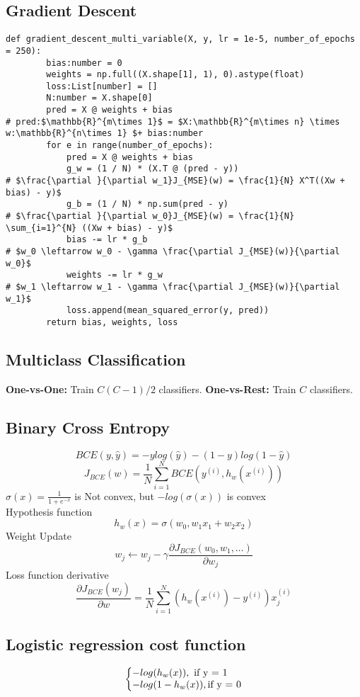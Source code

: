 \documentclass[twocolumn, 10pt]{article}
\makeatletter
\newenvironment{system}%
{\left\lbrace\begin{array}{@{}l@{}}}%
{\end{array}\right.}
\makeatother
\begin{document}
\subsection*{Gradient Descent}
\begin{lstlisting}[mathescape=true]
    def gradient_descent_multi_variable(X, y, lr = 1e-5, number_of_epochs = 250):
        bias:number = 0
        weights = np.full((X.shape[1], 1), 0).astype(float)
        loss:List[number] = []
        N:number = X.shape[0]  
        pred = X @ weights + bias       
# pred:$\mathbb{R}^{m\times 1}$ = $X:\mathbb{R}^{m\times n} \times w:\mathbb{R}^{n\times 1} $+ bias:number
        for e in range(number_of_epochs): 
            pred = X @ weights + bias
            g_w = (1 / N) * (X.T @ (pred - y)) 
# $\frac{\partial }{\partial w_1}J_{MSE}(w) = \frac{1}{N} X^T((Xw + bias) - y)$
            g_b = (1 / N) * np.sum(pred - y)   
# $\frac{\partial }{\partial w_0}J_{MSE}(w) = \frac{1}{N} \sum_{i=1}^{N} ((Xw + bias) - y)$
            bias -= lr * g_b                   
# $w_0 \leftarrow w_0 - \gamma \frac{\partial J_{MSE}(w)}{\partial w_0}$
            weights -= lr * g_w                
# $w_1 \leftarrow w_1 - \gamma \frac{\partial J_{MSE}(w)}{\partial w_1}$
            loss.append(mean_squared_error(y, pred))
        return bias, weights, loss  
    \end{lstlisting}
\subsection*{Multiclass Classification}
\textbf{One-vs-One:} Train $C(C-1)/2$ classifiers.
\textbf{One-vs-Rest:} Train $C$ classifiers.

\subsection*{Binary Cross Entropy}
\[BCE(y, \hat{y}) = -ylog(\hat{y}) - (1 - y)log(1 - \hat{y})\]
\[J_{BCE}(w) = \frac{1}{N} \sum_{i=1}^{N} BCE(y^{(i)}, h_w(x^{(i)}))\]
$\sigma(x) = \frac{1}{1 + e^{-x}}$ is Not convex, but
$-log(\sigma(x))$ is convex\\
Hypothesis function
\[h_w(x) = \sigma(w_0, w_1 x_1 + w_2 x_2) \]
Weight Update
\[w_j \leftarrow w_j - \gamma \frac{\partial J_{BCE}(w_0, w_1, \dots)}{\partial w_j}\]
Loss function derivative
\[\frac{\partial J_{BCE}(w_j)}{\partial w} = \frac{1}{N} \sum_{i=1}^{N} (h_w(x^{(i)}) - y^{(i)})x_j^{(i)}\]
\subsection{Logistic regression cost function}
\begin{equation}
    \begin{system}
    -log(h_w(x)), \text{ if y = 1}\\
    -log(1 - h_w(x)), \text{if y = 0}
    \end{system}
\end{equation}
\end{document}
